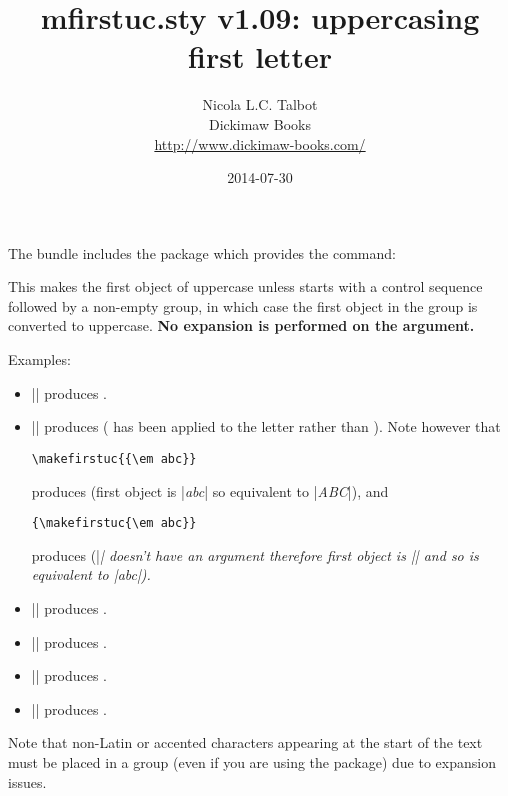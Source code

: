 \documentclass{nlctdoc}
\begin{document}
 \title{mfirstuc.sty v1.09: 
uppercasing first letter}
 \author{Nicola L.C. Talbot\\[10pt]
Dickimaw Books\\
\url{http://www.dickimaw-books.com/}}

 \date{2014-07-30}
 \maketitle

The  bundle includes the package 
 which provides the command:
\begin{definition}[\DescribeMacro{\makefirstuc}]
\end{definition}
This makes the first object of
 uppercase unless  starts with a control
sequence followed by a non-empty group, in which case the first
object in the group is converted to uppercase.
\textbf{No expansion is performed on the argument.}

Examples:
\begin{itemize}
\item || produces .

\item || produces 
( has been applied to the letter  rather
than ). Note however that
\begin{verbatim}
\makefirstuc{{\em abc}}
\end{verbatim}
produces  (first object is |{\em abc}| so
equivalent to |\MakeUppercase{\em abc}|), and
\begin{verbatim}
{\makefirstuc{\em abc}}
\end{verbatim}
produces {} (|\em| doesn't have an argument
therefore first object is |\em| and so is equivalent to
|{\MakeUppercase{\em}abc}|).

\item || produces .

\item || produces .

\item || produces .

\item || produces .

\end{itemize}
Note that non-Latin or accented characters appearing at the
start of the text must be placed in a group (even if you are
using the  package) due to expansion issues.
\end{document}
